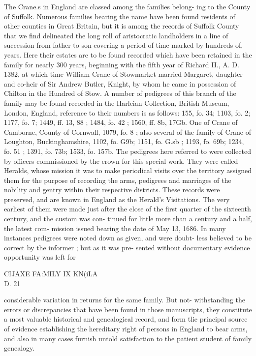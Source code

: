 The Crane.s in England are classed among the families belong- 
ing to the County of Suffolk. Numerous families bearing the 
name have been found residents of other counties in Great 
Britain, but it is among the records of Suffolk County that we 
find delineated the long roll of aristocratic landholders in a line 
of succession from father to son covering a period of time marked 
by hundreds of, years. Here their estates are to be found recorded 
which have been retained in the family for nearly 300 years, 
beginning with the fifth year of Richard II., A. D. 1382, at 
which time William Crane of Stowmarket married Margaret, 
daughter and co-heir of Sir Andrew Butler, Knight, by whom he 
came in possession of Chilton in the Hundred of Stow. A number 
of pedigrees of this branch of the family may be found recorded 
in the Harleian Collection, British Museum, London, England, 
reference to their numbers is as follows: 155, fo. 34; 1103, fo. 
2; 1177, fo. 7; 1449, ff. 13, 88 ; 1484, fo. 42 ; 1560, ff. 8b, 17Gb. 
One of Crane of Camborne, County of Cornwall, 1079, fo. 8 ; also 
several of the family of Crane of Loughton, Buckinghamshire, 
1102, fo. G9b; 1151, fo. G.sb ; 1193, fo. 69b; 1234, fo. 51 ; 1391, 
fo. 73b; 1533, fo. 157b. The pedigrees here referred to were 
collected by officers commissioned by the crown for this special 
work. They were called Heralds, whose mission it was to make 
periodical visits over the territory assigned them for the purpose 
of recording the arms, pedigrees and marriages of the nobility 
and gentry within their respective districts. These records were 
preserved, and are known in England as the Herald's Visitations. 
The very earliest of them were made just after the close of the 
first quarter of the sixteenth century, and the custom was con- 
tinued for little more than a century and a half, the latest com- 
mission issued bearing the date of May 13, 1686. In many 
instances pedigrees were noted down as given, and were doubt- 
less believed to be correct by the informer ; but as it was pre- 
sented without documentary evidence opportunity was left for 



CIJAXE FA:MILY IX KN(iLA\\D. 21 

considerable variation in returns for the same family. But not- 
withstanding the errors or discrepancies that have been found in 
those manuscripts, they constitute a most valuable historical and 
genealogical record, and form tlie principal source of evidence 
establishing the hereditary right of persons in England to bear 
arms, and also in many cases furnish untold satisfaction to the 
patient student of family genealogy. 

